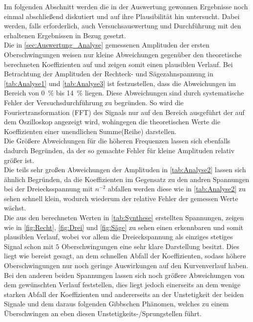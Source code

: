 Im folgenden Abschnitt werden die in der Auswertung gewonnen Ergebnisse
noch einmal abschließend diskutiert und auf ihre Plausibilität hin untersucht.
Dabei werden, falls erforderlich, auch Versuchsauswertung und Durchführung
mit den erhaltenen Ergebnissen in Bezug gesetzt.\\

Die in  \cref{sec:Auswertung_Analyse} gemessenen Amplituden der ersten 
Oberschwingungen weisen nur kleine Abweichungen gegenüber den theoretische
berechneten Koeffizienten auf und zeigen somit einen plausiblen Verlauf.
Bei Betrachtung der 
Amplituden der Rechteck- und Sägezahnspannung in \cref{tab:Analyse1} und 
\ref{tab:Analyse3} ist festzustellen, dass die Abweichungen 
im Bereich von \SI{0}{\percent} bis \SI{14}{\percent} liegen. 
Diese Abweichungen sind durch systematische Fehler der Versuchsdurchführung 
zu begründen.
So wird die Fouriertransformation (FFT) des Signals nur auf den Bereich
ausgeführt der auf dem Oszilloskop angezeigt wird, wohingegen die 
theoretischen Werte die Koeffizienten einer unendlichen Summe(Reihe) 
darstellen.\\
Die Größere Abweichungen für die höheren Frequenzen lassen sich ebenfalls 
dadurch Begründen, da der so gemachte Fehler für kleine Amplituden 
relativ größer ist.\\
Die teils sehr großen Abweichungen der Amplituden in \cref{tab:Analyse2} 
lassen sich ähnlich Begründen, da die Koeffizienten im Gegensatz zu den 
andren Spannungen bei der Dreiecksspannung mit $n^{-2}$ abfallen 
werden diese wie in \cref{tab:Analyse2} zu sehen schnell klein, wodurch wiederum 
der relative Fehler der gemessen Werte wächst.\\

Die aus den berechneten Werten in \cref{tab:Synthese} erstellten Spannungen,
zeigen wie in \cref{fig:Recht}, \ref{fig:Drei} und \ref{fig:Säge} zu sehen 
einen erkennbaren und somit plausiblen Verlauf, wobei vor allem die Dreieckspannung
als einziges stetiges Signal schon mit $5$ Oberschwingungen eine sehr klare Darstellung 
besitzt. Dies liegt wie bereist gesagt, an dem schnellen Abfall der Koeffizienten, sodass 
höhere Oberschwingungen nur noch geringe Auswirkungen auf den Kurvenverlauf haben.
Bei den anderen beiden Spannungen lassen sich noch größere Abweichungen von dem gewünschten 
Verlauf feststellen, dies liegt jedoch einerseits an dem wenige starken Abfall der 
Koeffizienten und andererseits an der Unstetigkeit der beiden Signale und dem daraus folgenden
Gibbschen Phänomen, welches zu einem Überschwingen an eben diesen Unstetigkeits-/Sprungstellen
führt.          